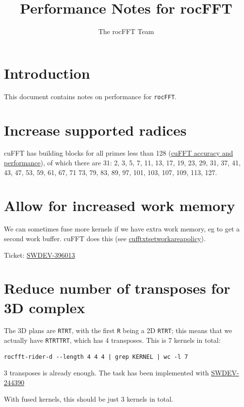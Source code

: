 \documentclass[12pt]{article}
\title{Performance Notes for rocFFT}
\author{The rocFFT Team}
\renewcommand{\(}{\left(}
\renewcommand{\)}{\right)}
\begin{document}
\maketitle

\section{Introduction}

This document contains notes on performance for \texttt{rocFFT}.

\section{Increase supported radices}

cuFFT has building blocks for all primes less than 128
(\href{https://docs.nvidia.com/cuda/cufft/index.html#accuracy-and-performance}{cuFFT
  accuracy and performance}), of which there are 31: 2, 3, 5, 7, 11,
13, 17, 19, 23, 29, 31, 37, 41, 43, 47, 53, 59, 61, 67, 71 73, 79, 83,
89, 97, 101, 103, 107, 109, 113, 127.

\section{Allow for increased work memory}

We can sometimes fuse more kernels if we have extra work memory, eg to
get a second work buffer.  cuFFT does this
(see \href{https://docs.nvidia.com/cuda/cufft/index.html#function-cufftxtsetworkareapolicy}{cufftxtsetworkareapolicy}).

Ticket: \href{https://ontrack-internal.amd.com/browse/SWDEV-396013}{SWDEV-396013}

\section{Reduce number of transposes for 3D complex}

The 3D plans are \texttt{RTRT}, with the first \texttt{R} being a 2D
\texttt{RTRT}; this means that we actually have \texttt{RTRTTRT}, which has 4
transposes.  This is 7 kernels in total:
\begin{verbatim}
rocfft-rider-d --length 4 4 4 | grep KERNEL | wc -l 7
\end{verbatim}
3 transposes is already enough. The task has been implemented with 
\href{http://ontrack-internal.amd.com/browse/SWDEV-244390}{SWDEV-244390}


With fused kernels, this should be
just 3 kernels in total.
\end{document}
